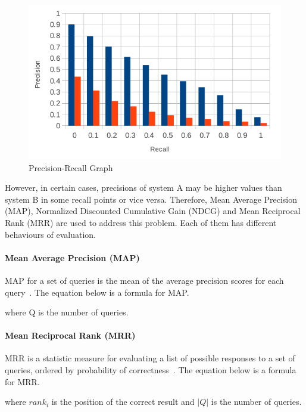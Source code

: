 \begin{figure}
\centering
\includegraphics[scale=0.5]{./figures/pr_example.png}
\caption{Precision-Recall Graph} \label{fig:pr_example} 
\end{figure}

However, in certain cases, precisions of system A may be higher values than system B in some recall points or vice versa. Therefore,
Mean Average Precision (MAP), Normalized Discounted Cumulative Gain (NDCG) and Mean Reciprocal Rank (MRR) are used to address this problem.
Each of them has different behaviours of evaluation.

\paragraph{Mean Average Precision (MAP)}
MAP for a set of queries is the mean of the average precision scores for each query~\cite{IR}. The equation below is
a formula for MAP.
\begin{center}
\end{center}
where Q is the number of queries.

\paragraph{Mean Reciprocal Rank (MRR)}
MRR is a statistic measure for evaluating a list of possible responses to a set of queries, ordered by 
probability of correctness~\cite{mrr}. The equation below is a formula for MRR.
\begin{center}
\end{center}
where $rank_i$ is the position of the correct result and $|Q|$ is the number of queries.

